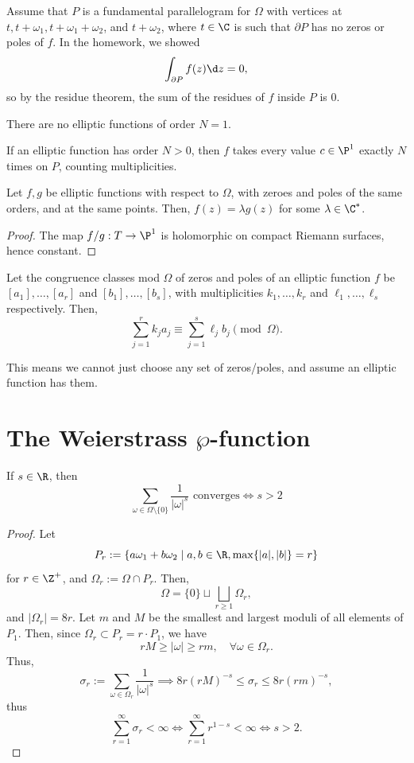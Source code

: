 \documentclass[11pt]{report}
\begin{document}
Assume that $P$ is a fundamental parallelogram for $\Omega$ with vertices at $t,t+\omega_1,t+\omega_1+\omega_2$, and $t+\omega_2$, where $t \in \C$ is such that $\partial P$ has no zeros or poles of $f$. In the homework, we showed
$$\int_{\partial P}f(z) \d z =0,$$
so by the residue theorem, the sum of the residues of $f$ inside $P$ is $0$.

\begin{cor}
    There are no elliptic functions of order $N=1$.
\end{cor}

\begin{cor}
    If an elliptic function has order $N>0$, then $f$ takes every value $c \in \P^1$ exactly $N$ times on $P$, counting multiplicities.
\end{cor}

\begin{cor}[][label=cor:f_eq_lamg]
    Let $f,g$ be elliptic functions with respect to $\Omega$, with zeroes and poles of the same orders, and at the same points. Then, $f(z) = \lambda g(z)$ for some $\lambda \in \C^*$.
\end{cor}

\begin{proof}
    The map $f/g:T \to \P^1$ is holomorphic on compact Riemann surfaces, hence constant.
\end{proof}

\begin{thm}
    Let the congruence classes mod $\Omega$ of zeros and poles of an elliptic function $f$ be $[a_1],\dots,[a_r]$ and $[b_1],\dots,[b_s]$, with multiplicities $k_1,\dots,k_r$ and $\ell_1,\dots,\ell_s$ respectively. Then,
    $$\sum_{j=1}^rk_ja_j \equiv \sum_{j=1}^s \ell_jb_j \pmod \Omega.$$
\end{thm}
This means we cannot just choose any set of zeros/poles, and assume an elliptic function has them.

\section{\texorpdfstring{The Weierstrass $\wp$-function}{The Weierstrass p-function}}

\begin{lem}
    If $s \in \R$, then
    $$\sum_{\omega \in \Omega\setminus\{0\}}\frac{1}{|\omega|^s} \text{ converges} \iff s>2$$
\end{lem}

\begin{proof}
    Let 
    $$P_r:=\{a\omega_1+b\omega_2 \mid a,b\in \R, \max \{|a|,|b|\} =r\}$$ 
    for $r \in \Z^+$, and $\Omega_r:= \Omega \cap P_r$. Then,
    $$\Omega =\{0\} \sqcup \bigsqcup_{r \geq 1}\Omega_r,$$
    and $|\Omega_r| = 8r$. Let $m$ and $M$ be the smallest and largest moduli of all elements of $P_1$. Then, since $\Omega_r \subset P_r = r\cdot P_1$, we have
    $$rM \ge |\omega| \geq rm, \quad \forall \omega \in \Omega_r.$$
    Thus,
    $$\sigma _r := \sum_{\omega \in \Omega_r}\frac{1}{|\omega|^s}\implies 8r(rM)^{-s}\leq \sigma_r \leq 8r(rm)^{-s},$$
    thus
    $$\sum_{r=1}^\infty \sigma_r < \infty \iff \sum_{r=1}^\infty r^{1-s}<\infty \iff s>2.$$
\end{proof}
\end{document}
